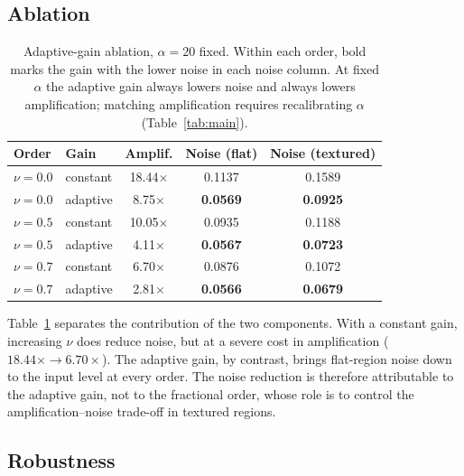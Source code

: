 \documentclass[conference]{IEEEtran}
\begin{document}
\subsection{Ablation}

\begin{table}[t]
\caption{Adaptive-gain ablation, $\alpha = 20$ fixed. Within each order, bold
marks the gain with the lower noise in each noise column. At fixed $\alpha$
the adaptive gain always lowers noise and always lowers amplification;
matching amplification requires recalibrating $\alpha$
(Table~\ref{tab:main}).}
\label{tab:ablation}
\centering
\begin{tabular}{llccc}
\toprule
Order & Gain & Amplif. & Noise (flat) & Noise (textured) \\
\midrule
$\nu = 0.0$ & constant & 18.44$\times$ & 0.1137 & 0.1589 \\
$\nu = 0.0$ & adaptive & 8.75$\times$  & \textbf{0.0569} & \textbf{0.0925} \\
$\nu = 0.5$ & constant & 10.05$\times$ & 0.0935 & 0.1188 \\
$\nu = 0.5$ & adaptive & 4.11$\times$  & \textbf{0.0567} & \textbf{0.0723} \\
$\nu = 0.7$ & constant & 6.70$\times$  & 0.0876 & 0.1072 \\
$\nu = 0.7$ & adaptive & 2.81$\times$  & \textbf{0.0566} & \textbf{0.0679} \\
\bottomrule
\end{tabular}
\end{table}

Table~\ref{tab:ablation} separates the contribution of the two components.
With a constant gain, increasing $\nu$ does reduce noise, but at a severe cost
in amplification ($18.44\times \to 6.70\times$). The adaptive gain, by
contrast, brings flat-region noise down to the input level at every order.
The noise reduction is therefore attributable to the adaptive gain, not to
the fractional order, whose role is to control the amplification--noise
trade-off in textured regions.

\subsection{Robustness}
\end{document}
